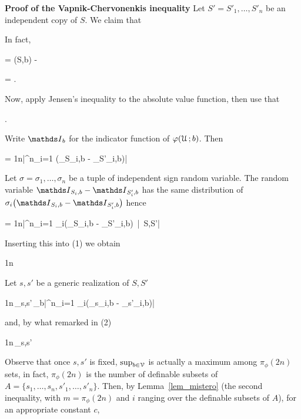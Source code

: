 \documentclass[scombinatorics.tex]{subfiles}
\begin{document}
\textbf{Proof of the Vapnik-Chervonenkis inequality}
  Let $S'=S'_1,\dots,S'_n$ be an independent copy of $S$.
  We claim that

  {\le}
  {\Ex{}}

  In fact,

  {=}
  {\Fr(S,b) - \Ex\big[\Fr(S',b)\big]}

  \ceq{}
  {=}
  {\Ex{}.}

  Now, apply Jensen's inequality to the absolute value function, then use that 

  {\le}
  {\Ex{}.}

  Write $\Indicator_b$ for the indicator function of $\varphi(\EuScript U\,;b)$.
  Then

  {=}
  {\frac1n\bigg|\sum^n_{i=1} \Big(\Indicator_{S_i,b} -  \Indicator_{S'_i,b}\Big)\bigg|}

  Let $\sigma=\sigma_1,\dots,\sigma_n$ be a tuple of independent sign random variable.
  The random variable $\Indicator_{S_i,b} -  \Indicator_{S'_i,b}$ has the same distribution of $\sigma_i\big(\Indicator_{S_i,b} -  \Indicator_{S'_i,b}\big)$ hence

  \ceq{}
  {=}
  {\frac1n\Ex\bigg|\sum^n_{i=1} \sigma_i\Big(\Indicator_{S_i,b} -  \Indicator_{S'_i,b}\Big)\ \Big|\ S,S'\bigg|}

  Inserting this into (1) we obtain

  {\le}
  {\frac1n\,\Ex\bigg[\sup_{b\in\V}\Ex\bigg|\sum^n_{i=1} \sigma_i\Big(\Indicator_{S_i,b} -  \Indicator_{S'_i,b}\Big)\ \Big|\ S,S'\bigg|\bigg]}

  Let $s,s'$ be a generic realization of $S,S'$

  \ceq{}
  {\le}
  {\frac1n\,\sup_{s,s'}\,\sup_{b\in\V}\Ex\bigg|\sum^n_{i=1} \sigma_i\big(\Indicator_{s_i,b} -  \Indicator_{s'_i,b}\big)\bigg|}

  and, by what remarked in (2)

  \ceq{}
  {\le}
  {\frac1n\,\sup_{s,s'}\Ex\bigg[\sup_{b\in\V}\bigg|\sum^n_{i=1} \sigma_i\big(\Indicator_{s_i,b} -  \Indicator_{s'_i,b}\big)\bigg|\bigg]}

  Observe that once $s,s'$ is fixed, $\sup_{b\in\EuScript V}$ is actually a maximum among $\pi_\phi(2n)$ sets, in fact, $\pi_\phi(2n)$ is the number of definable subsets of $A=\{s_1,\dots,s_n,s'_1,\dots,s'_n\}$.
  Then, by Lemma~\ref{lem_mistero} (the second inequality, with $m =\pi_\phi(2n)$ and $i$ ranging over the definable subsets of $A$), for an appropriate constant $c$,
\end{document}
